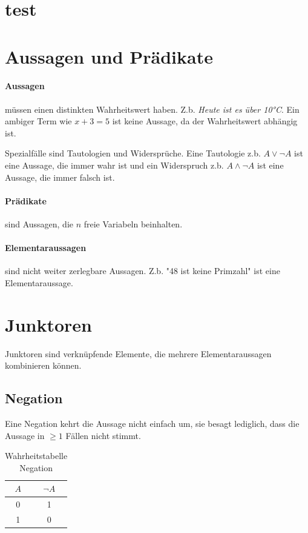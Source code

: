 \documentclass{article}
\author{Philipp Kiss}
\begin{document}

\section{test}
\section{Aussagen und Prädikate}
\paragraph{Aussagen} müssen einen distinkten Wahrheitswert haben.
Z.b. \textit{Heute ist es über 10°C}. Ein ambiger Term wie \(x+3=5\) ist keine Aussage, da der Wahrheitswert abhängig ist.

Spezialfälle sind Tautologien und Widersprüche. Eine Tautologie z.b. \(A \vee \neg A\) ist eine Aussage, die immer wahr ist und ein Widerspruch z.b. \(A \wedge \neg A\) ist eine Aussage, die immer falsch ist.

\paragraph{Prädikate}
sind Aussagen, die \(n\) freie Variabeln beinhalten.

\paragraph{Elementaraussagen} sind nicht weiter zerlegbare Aussagen.
Z.b. "48 ist keine Primzahl" ist eine Elementaraussage.
\section{Junktoren}
Junktoren sind verknüpfende Elemente, die mehrere Elementaraussagen kombinieren können.
\subsection{Negation}
Eine Negation kehrt die Aussage nicht einfach um, sie besagt lediglich, dass die Aussage in \(\geq 1\) Fällen nicht stimmt.
\begin{table}[h!]
		\begin{center}
				\caption{Wahrheitstabelle Negation}
				\label{tab:}
				\begin{tabular}{c|c}
						\(A\) & \(\neg A\) \\
						\hline
						0 & 1\\
						1 & 0\\
				\end{tabular}
		\end{center}
\end{table}
\end{document}
